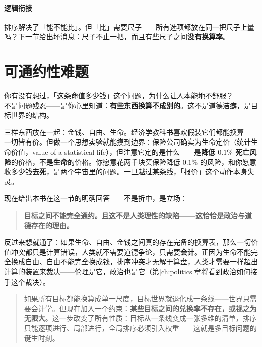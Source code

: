 \documentclass[../../main2.tex]{subfiles}
\begin{document}
	\paragraph*{逻辑衔接}
	排序解决了「能不能比」。但「比」需要尺子——所有选项都放在同一把尺子上量吗？下一节给出坏消息：尺子不止一把，而且有些尺子之间\textbf{没有换算率}。

	\section{可通约性难题}
	\label{sec:goal-commensurability}

	\begin{readingnote}
		你有没有想过，「这条命值多少钱」这个问题，为什么让人本能地不舒服？\\
		不是问题残忍——是你心里知道：\textbf{有些东西换算不成别的}。这不是道德洁癖，是目标世界的结构。
	\end{readingnote}

	三样东西放在一起：金钱、自由、生命。经济学教科书喜欢假装它们都能换算——一切皆有价。但做一个思想实验就能摸到边界：保险公司确实为生命定价（统计生命价值，value of a statistical life），但注意它定的是什么——是\textbf{降低 $0.1\%$ 死亡风险}的价格，不是\textbf{生命}的价格。你愿意花两千块买保险降低 $0.1\%$ 的风险，和你愿意收多少钱\textbf{去死}，是两个宇宙里的问题。一旦越过某条线，「报价」这个动作本身失灵。

	现在给出本书在这一节的明确回答——不是折中，是立场：

	\begin{quote}
		\textbf{目标之间不能完全通约。且这不是人类理性的缺陷——这恰恰是政治与道德存在的理由。}
	\end{quote}

	反过来想就通了：如果生命、自由、金钱之间真的存在完备的换算表，那么一切价值冲突都只是计算错误，人类就不需要道德争论，只需要\textbf{会计}。正因为生命不能完全换成自由、自由不能完全换成钱，排序冲突才无解于算盘，人类才需要一样超出计算的装置来裁决——伦理是它，政治也是它（第\ref{ch:politics}章将看到政治如何接手这个裁决）。

	\begin{quote}
		如果所有目标都能换算成单一尺度，目标世界就退化成一条线——世界只需要会计学。但现在加入一个约束：\textbf{某些目标之间的兑换率不存在，或视之为无限大}。这一步改变了所有性质：目标从一条线变成一张多维的清单，排序只能逐项进行、局部进行，全局排序必须引入权重——这就是多目标问题的诞生时刻。
	\end{quote}
\end{document}
